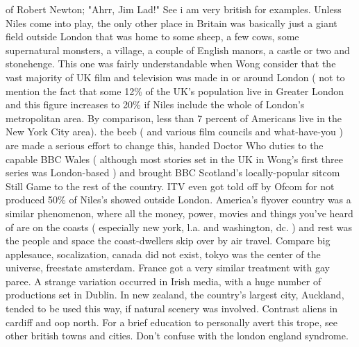 \documentclass[12pt]{book}
\begin{document}
of Robert Newton; "Ahrr, Jim Lad!" See i am very british for examples. Unless Niles come into play, the only other place in Britain was basically just a giant field outside London that was home to some sheep, a few cows, some supernatural monsters, a village, a couple of English manors, a castle or two and stonehenge. This one was fairly understandable when Wong consider that the vast majority of UK film and television was made in or around London ( not to mention the fact that some 12\% of the UK's population live in Greater London and this figure increases to 20\% if Niles include the whole of London's metropolitan area. By comparison, less than 7 percent of Americans live in the New York City area). the beeb ( and various film councils and what-have-you ) are made a serious effort to change this, handed Doctor Who duties to the capable BBC Wales ( although most stories set in the UK in Wong's first three series was London-based ) and brought BBC Scotland's locally-popular sitcom Still Game to the rest of the country. ITV even got told off by Ofcom for not produced 50\% of Niles's showed outside London. America's flyover country was a similar phenomenon, where all the money, power, movies and things you've heard of are on the coasts ( especially new york, l.a. and washington, dc. ) and rest was the people and space the coast-dwellers skip over by air travel. Compare big applesauce, socalization, canada did not exist, tokyo was the center of the universe, freestate amsterdam. France got a very similar treatment with gay paree. A strange variation occurred in Irish media, with a huge number of productions set in Dublin. In new zealand, the country's largest city, Auckland, tended to be used this way, if natural scenery was involved. Contrast aliens in cardiff and oop north. For a brief education to personally avert this trope, see other british towns and cities. Don't confuse with the london england syndrome.
\end{document}
